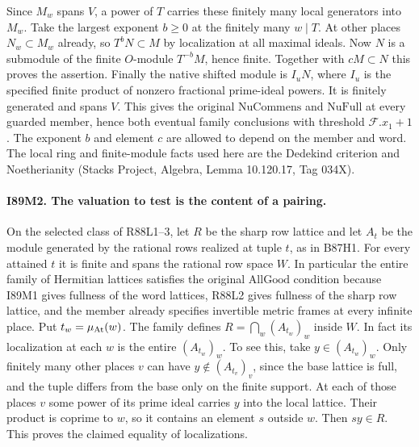 Since $M_w$ spans $V$, a power of $T$ carries these finitely many
local generators into $M_w$. Take the largest exponent $b\geq0$
at the finitely many $w\mid T$. At other places $N_w\subset M_w$
already, so $T^bN\subset M$ by localization at all maximal ideals.
Now $N$ is a submodule of the finite $O$-module $T^{-b}M$, hence
finite. Together with $cM\subset N$ this proves the assertion.
Finally the native shifted module is $I_uN$, where $I_u$ is the
specified finite product of nonzero fractional prime-ideal powers.
It is finitely generated and spans $V$. This gives the original
$\mathrm{NuCommens}$ and $\mathrm{NuFull}$ at every guarded member,
hence both eventual family conclusions with threshold
$\mathcal F.x_1+1$. The exponent $b$ and element $c$ are allowed to
depend on the member and word. The local ring and finite-module facts
used here are the Dedekind criterion and Noetherianity
(Stacks Project, Algebra, Lemma 10.120.17, Tag 034X).

\paragraph{I89M2. The valuation to test is the content of a pairing.}
On the selected class of R88L1--3, let $R$ be the sharp row lattice
and let $A_t$ be the module generated by the rational rows realized
at tuple $t$, as in B87H1. For every attained $t$ it is finite and
spans the rational row space $W$. In particular the entire family of
Hermitian lattices satisfies the original $\mathrm{AllGood}$ condition because
I89M1 gives fullness of the word lattices, R88L2 gives fullness of
the sharp row lattice, and the member already specifies invertible
metric frames at every infinite place. Put $t_w=\mu_{\rm At}(w)$.
The family defines $R=\bigcap_w(A_{t_w})_w$ inside $W$.
In fact its localization at each $w$ is the entire
$(A_{t_w})_w$. To see this, take $y\in(A_{t_w})_w$.
Only finitely many other places $v$ can have
$y\notin(A_{t_v})_v$, since the base lattice is full, and the tuple differs
from the base only on the finite support. At each of those
places $v$ some power of its prime ideal carries $y$ into the
local lattice. Their product is coprime to $w$, so it contains
an element $s$ outside $w$. Then $sy\in R$. This proves the
claimed equality of localizations.

